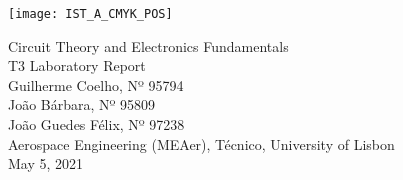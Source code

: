 
\thispagestyle {empty}

\texttt{[image: IST\_A\_CMYK\_POS]}

\begin{center}
%
\vspace{1.0cm}

\vspace{1cm}
{\FontLb Circuit Theory and Electronics Fundamentals} \\ %
\vspace{5cm}
{\FontLn T3 Laboratory Report}\vspace{1cm} \\
\vspace{5cm}
\vspace{1cm}
{\FontSn Guilherme Coelho, Nº 95794} \\
{\FontSn João Bárbara, Nº 95809} \\
{\FontSn João Guedes Félix, Nº 97238} \\
\vspace{1cm}
{\FontSn Aerospace Engineering (MEAer), Técnico, University of Lisbon} \\ %
\vspace{1cm}
{\FontSn May 5, 2021} \\ %
%
\end{center}

